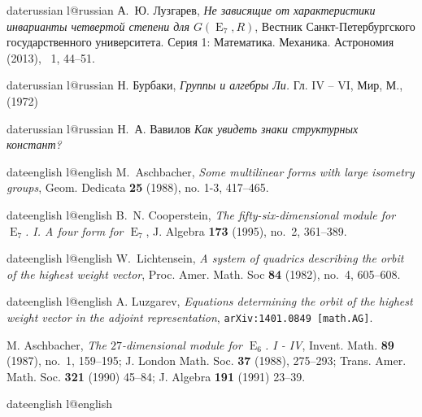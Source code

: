 \documentclass[a4paper,12pt]{amsart}
\def\E{\operatorname{E}}
\theoremstyle{plain}
\theoremstyle{remark}
\theoremstyle{definition}
\begin{document}
\begin{thebibliography}{99}
\def\selectlanguageifdefined#1{
\expandafter\ifx\csname date#1\endcsname\relax
\else\language\csname l@#1\endcsname\fi}


\selectlanguageifdefined{russian}
А.~Ю. Лузгарев, \emph{Не зависящие от характеристики инварианты четвертой степени
для {$G(\E_7,R)$}}, Вестник {С}анкт-{П}етербургского государственного
университета. {С}ерия 1: {М}атематика. {М}еханика. {А}строномия (2013),
{\cyr\textnumero}~1, 44--51.

\selectlanguageifdefined{russian}
Н. Бурбаки, \emph{Группы и алгебры Ли.} Гл. {\rm IV -- VI}, Мир, М., (1972)

\selectlanguageifdefined{russian}
Н.~А. Вавилов \emph{Как увидеть знаки структурных констант?}

\selectlanguageifdefined{english}
M.~Aschbacher, \emph{Some multilinear forms with large isometry groups}, Geom.
  Dedicata \textbf{25} (1988), no. 1-3, 417--465.

\selectlanguageifdefined{english}
B.~N. Cooperstein, \emph{The fifty-six-dimensional module for {$\E_7$}. {I}.
  {A} four form for {$\E_7$}}, J. Algebra \textbf{173} (1995), no.~2, 361--389.

\selectlanguageifdefined{english}
W.~Lichtensein, \emph{A system of quadrics describing the orbit of the highest
  weight vector}, Proc. Amer. Math. Soc \textbf{84} (1982), no.~4, 605--608.

\selectlanguageifdefined{english}
A. Luzgarev, \emph{Equations determining the orbit of the highest weight vector
in the adjoint representation}, {\tt arXiv:1401.0849 [math.AG]}.

M. Aschbacher, \emph{The $27$-dimensional module for $\E_6$. {\rm I - IV}},
Invent. Math. \textbf{89} (1987), no.~1, 159--195;
J. London Math. Soc. \textbf{37} (1988), 275--293;
Trans. Amer. Math. Soc. \textbf{321} (1990) 45--84;
J. Algebra \textbf{191} (1991) 23--39.
\selectlanguageifdefined{english}


\end{thebibliography}
\end{document}
